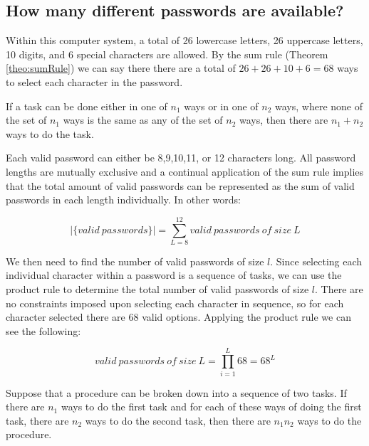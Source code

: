 \subsection{How many different passwords are available?}
Within this computer system, a total of 26 lowercase letters, 26 uppercase letters, 10 digits, and 6 special characters are allowed. By the sum rule (Theorem \ref{theo:sumRule}) we can say there there are a total of $26+26+10+6=68$ ways to select each character in the password.

\begin{theo}
If a task can be done either in one of $n_1$ ways or in one of $n_2$ ways, where
none of the set of $n_1$ ways is the same as any of the set of $n_2$ ways, then there are $n_1 + n_2$
ways to do the task.
\label{theo:sumRule}
\end{theo}

Each valid password can either be 8,9,10,11, or 12 characters long. All password lengths are mutually exclusive and a continual application of the sum rule implies that the total amount of valid passwords can be represented as the sum of valid passwords in each length individually. In other words:

\begin{equation}
|\{valid~passwords\}| = \sum_{L=8}^{12}{valid~passwords~of~size~L}
\label{eq:totalValidPasswords}
\end{equation}

We then need to find the number of valid passwords of size $l$. Since selecting each individual character within a password is a sequence of tasks, we can use the product rule to determine the total number of valid passwords of size $l$. There are no constraints imposed upon selecting each character in sequence, so for each character selected there are $68$ valid options. Applying the product rule we can see the following:

\begin{equation}
valid~passwords~of~size~L = \prod_{i=1}^{L}{68} = 68^{L}
\label{eq:validPasswordsLenL}
\end{equation}

\begin{theo}
Suppose that a procedure can be broken down into a sequence of
two tasks. If there are $n_1$ ways to do the first task and for each of these ways of doing the first
task, there are $n_2$ ways to do the second task, then there are $n_1n_2$ ways to do the procedure.
\end{theo}

